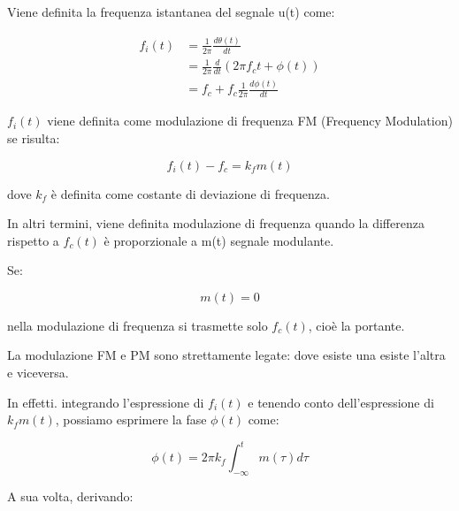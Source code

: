 Viene definita la frequenza istantanea del segnale u(t) come: 

{
    \Large 
    \begin{equation}
        \begin{split}
            f_i (t)
            &= 
            \frac{1}{2 \pi }
            \frac{d \theta(t)}{dt}
            \\
            &= 
            \frac{1}{2 \pi }
            \frac{d}{dt}
            (2 \pi f_c t + \phi (t))
            \\
            &= 
            f_c + f_c \frac{1}{2 \pi} \frac{d \phi (t)}{dt}
        \end{split}
    \end{equation}
}

$f_i (t)$ viene definita come modulazione di frequenza FM (Frequency Modulation) se risulta: 

{
    \Large 
    \begin{equation}
        f_i (t) - f_c = k_f m(t)
    \end{equation}
}

dove $k_f$ è definita come costante di deviazione di frequenza. \newline 

In altri termini, viene definita modulazione di frequenza quando la differenza rispetto a $f_c (t)$ è proporzionale a m(t) segnale modulante. \newline 

Se: 

{
    \Large 
    \begin{equation}
        m(t) = 0
    \end{equation}
}

nella modulazione di frequenza si trasmette solo $f_c(t)$, cioè la portante. \newline 

La modulazione FM e PM sono strettamente legate: 
dove esiste una esiste l'altra e viceversa. \newline 

In effetti. integrando l'espressione di $f_i (t)$ e tenendo conto dell'espressione di $k_f m(t)$, 
possiamo esprimere la fase $\phi (t)$ come: 

{
    \Large 
    \begin{equation}
        \phi (t)
        = 
        2 \pi k_f 
        \int_{- \infty}^{t}
        m (\tau) d\tau
    \end{equation}
}

A sua volta, derivando: 

